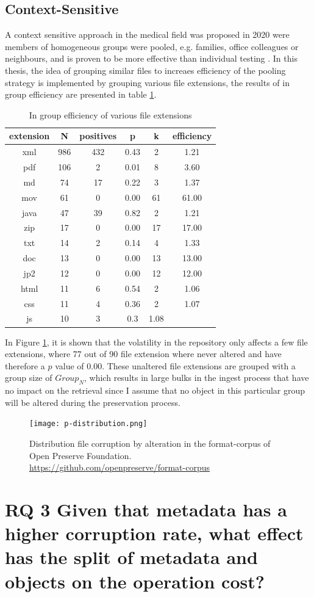 \subsection{Context-Sensitive}
A context sensitive approach in the medical field was proposed in 2020 were members of homogeneous groups were pooled, e.g. families, office colleagues or neighbours, and is proven to be more effective than individual testing \cite[4]{deckert2020simulation}. In this thesis, the idea of grouping similar files to increaes efficiency of the pooling strategy is implemented by grouping various file extensions, the results of in group efficiency are presented in table \ref{tb-efficiency}.
\begin{table}[b]
    \caption{In group efficiency of various file extensions}
    \centering
    \begin{tabular}{ c c c c c c}
    \label{tb-efficiency}
     extension & N & positives & p & k & efficiency\\ 
     \hline
     xml & 986 & 432 & 0.43  & 2 & 1.21\\  
     \hline
     pdf &106 &2 &0.01  & 8 &  3.60\\
     \hline
     md & 74 & 17 & 0.22  & 3 & 1.37\\    
     \hline
     mov&61 & 0 & 0.00 &  61 & 61.00\\  
     \hline
     java &47 &39&0.82 & 2  & 1.21\\  
     \hline
     zip & 17 &0 &0.00 &  17 & 17.00\\
     \hline
     txt & 14 & 2 & 0.14 &  4 & 1.33\\ 
     \hline
     doc & 13 & 0 & 0.00 &  13 & 13.00\\   
     \hline
     jp2 & 12 & 0 & 0.00 &  12 & 12.00\\    
     \hline
     html & 11 & 6 & 0.54 &  2 & 1.06\\   
     \hline
     css & 11 & 4 & 0.36 & 2  & 1.07\\ 
     \hline
     js & 10 & 3 & 0.3 & 1.08
    \end{tabular}
\end{table}
In Figure \ref{fig:p-distribution}, it is shown that the volatility in the repository only affects a few file extensions, where 77 out of 90 file extension where never altered and have therefore a $p$ value of 0.00. These unaltered file extensions are grouped with a group size of $Group_N$, which results in large bulks in the ingest process that have no impact on the retrieval since I assume that no object in this particular group will be altered during the preservation process. 
\begin{figure}[h]
    \caption{Distribution file corruption by alteration in the format-corpus of Open Preserve Foundation. \url{https://github.com/openpreserve/format-corpus}}
    \label{fig:p-distribution}
    \centering
    \texttt{[image: p-distribution.png]}
\end{figure}

\section{RQ 3 Given that metadata has a higher corruption rate, what effect has the split of metadata and objects on the operation cost?}